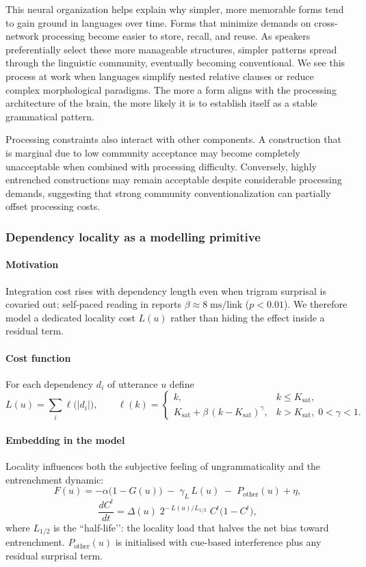 \documentclass[12pt,letterpaper]{article}
\begin{document}
This neural organization helps explain why simpler, more memorable forms tend to gain ground in languages over time. Forms that minimize demands on cross-network processing become easier to store, recall, and reuse. As speakers preferentially select these more manageable structures, simpler patterns spread through the linguistic community, eventually becoming conventional. We see this process at work when languages simplify nested relative clauses or reduce complex morphological paradigms. The more a form aligns with the processing architecture of the brain, the more likely it is to establish itself as a stable grammatical pattern.

Processing constraints also interact with other components. A construction that is marginal due to low community acceptance may become completely unacceptable when combined with processing difficulty. Conversely, highly entrenched constructions may remain acceptable despite considerable processing demands, suggesting that strong community conventionalization can partially offset processing costs.

\subsubsection{Dependency locality as a modelling primitive}\label{sec:dependency-locality}

\paragraph{Motivation}
Integration cost rises with dependency length even when trigram surprisal is covaried out; self-paced reading in \textcite{Bechet2022} reports \(\beta\approx8\;\text{ms/link}\) (\(p<0.01\)).  We therefore model a dedicated locality cost \(L(u)\) rather than hiding the effect inside a residual term.

\paragraph{Cost function}
For each dependency \(d_i\) of utterance \(u\) define
\[
L(u)=\sum_{i}\ell\!\bigl(|d_i|\bigr),\qquad
\ell(k)=
  \begin{cases}
    k, & k\le K_{\text{sat}},\\[4pt]
    K_{\text{sat}}+\beta\,(k-K_{\text{sat}})^{\gamma}, & k>K_{\text{sat}},\;0<\gamma<1.
  \end{cases}
\]

\paragraph{Embedding in the model}
Locality influences both the subjective feeling of ungrammaticality and the entrenchment dynamic:
\[
F(u)= -\alpha\bigl(1-G(u)\bigr)\;-\;\gamma_L\,L(u)\;-\;P_{\text{other}}(u)+\eta,
\]
\[
\frac{dC^{t}}{dt}= \Delta(u)\;2^{-\,L(u)/L_{1/2}}\;C^{t}\bigl(1-C^{t}\bigr),
\]
where \(L_{1/2}\) is the “half-life’’: the locality load that halves the net bias toward entrenchment.  
\(P_{\text{other}}(u)\) is initialised with cue-based interference \autocite{LewisVasishth2005} plus any residual surprisal term.
\end{document}
